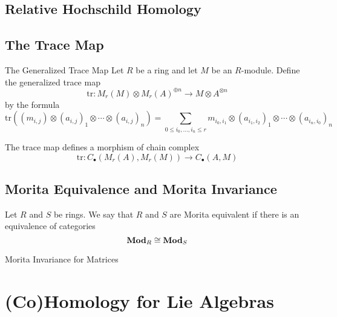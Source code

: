 \documentclass[a4paper]{article}
\begin{document}
\subsection{Relative Hochschild Homology}

\subsection{The Trace Map}
\begin{defn}{The Generalized Trace Map}{} Let $R$ be a ring and let $M$ be an $R$-module. Define the generalized trace map $$\text{tr}:M_r(M)\otimes M_r(A)^{\oplus n}\to M\otimes A^{\otimes n}$$ by the formula $$\text{tr}((m_{i,j})\otimes (a_{i,j})_1\otimes\cdots\otimes(a_{i,j})_n)=\sum_{0\leq i_0,\dots,i_n\leq r}m_{i_0,i_1}\otimes (a_{i_1,i_2})_1\otimes\cdots\otimes (a_{i_n,i_0})_n$$
\end{defn}

\begin{thm}{}{} The trace map defines a morphism of chain complex $$\text{tr}:C_\bullet(M_r(A),M_r(M))\to C_\bullet(A,M)$$
\end{thm}

\subsection{Morita Equivalence and Morita Invariance}
\begin{defn}{}{} Let $R$ and $S$ be rings. We say that $R$ and $S$ are Morita equivalent if there is an equivalence of categories $$\bold{Mod}_R\cong\bold{Mod}_S$$
\end{defn}

\begin{thm}{Morita Invariance for Matrices}{}
\end{thm}

\pagebreak
\section{(Co)Homology for Lie Algebras}
\end{document}
